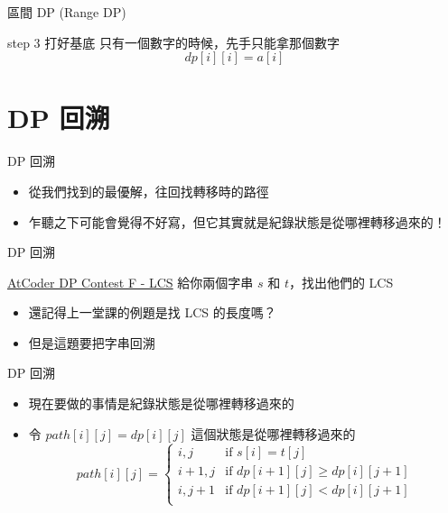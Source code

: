 \documentclass[aspectratio=169]{beamer}
\begin{document}
    \begin{frame}{區間 DP (Range DP)}
        \begin{block}{step 3 打好基底}
            只有一個數字的時候，先手只能拿那個數字
            $$dp[i][i] = a[i]$$
        \end{block}
    \end{frame}
    
    \section{DP 回溯}

    \begin{frame}{DP 回溯}
        \begin{itemize}
            \item 從我們找到的最優解，往回找轉移時的路徑
            \item<2-> 乍聽之下可能會覺得不好寫，但它其實就是紀錄狀態是從哪裡轉移過來的！
        \end{itemize}
    \end{frame}
        
    \begin{frame}{DP 回溯}
        \begin{block}{\href{https://atcoder.jp/contests/dp/tasks/dp_f}{AtCoder DP Contest F - LCS}}
            給你兩個字串 $s$ 和 $t$，找出他們的 LCS
        \end{block}
        \begin{itemize}
            \item 還記得上一堂課的例題是找 LCS 的長度嗎？
            \item<2-> 但是這題要把字串回溯
        \end{itemize}
    \end{frame}

    \begin{frame}{DP 回溯}
        \begin{itemize}
            \item 現在要做的事情是紀錄狀態是從哪裡轉移過來的
            \item<2-> 令 $path[i][j] = dp[i][j]$ 這個狀態是從哪裡轉移過來的
            $$
            path[i][j]=
            \begin{cases}
                {i,j}         & \text{if } s[i]=t[j] \\
                {i+1,j}       & \text{if } dp[i+1][j] \ge dp[i][j+1]\\
                {i,j+1}       & \text{if } dp[i+1][j]<dp[i][j+1]\\
            \end{cases}
            $$
        \end{itemize}
    \end{frame}
    
\end{document}
